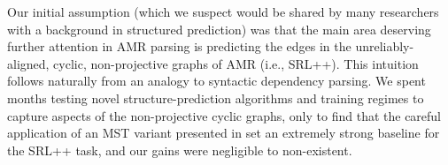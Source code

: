 
Our initial assumption (which we suspect would be shared by many researchers with a background in structured prediction) was that the main area deserving further attention in AMR parsing is predicting the edges in the unreliably-aligned, cyclic, non-projective graphs of AMR (i.e., SRL++).
This intuition follows naturally from an analogy to syntactic dependency parsing.
We spent months testing novel structure-prediction algorithms and training regimes to capture aspects of the non-projective cyclic graphs, only to find that the careful application of an MST variant presented in  set an extremely strong baseline for the SRL++ task, and our gains were negligible to non-existent.
